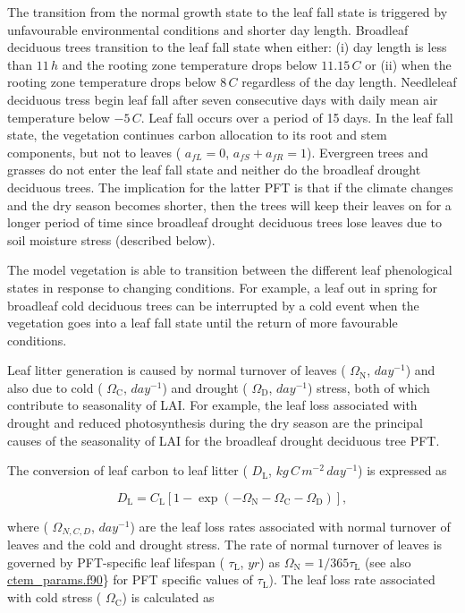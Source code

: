 The transition from the normal growth state to the leaf fall state is triggered by unfavourable environmental conditions and shorter day length. Broadleaf deciduous trees transition to the leaf fall state when either\+: (i) day length is less than $11\,h$ and the rooting zone temperature drops below $11.15\,C$ or (ii) when the rooting zone temperature drops below $8\,C$ regardless of the day length. Needleleaf deciduous tress begin leaf fall after seven consecutive days with daily mean air temperature below $-5\,C$. Leaf fall occurs over a period of 15 days. In the leaf fall state, the vegetation continues carbon allocation to its root and stem components, but not to leaves ( $a_{fL} = 0$, $a_{fS} + a_{fR} = 1$). Evergreen trees and grasses do not enter the leaf fall state and neither do the broadleaf drought deciduous trees. The implication for the latter P\+F\+T is that if the climate changes and the dry season becomes shorter, then the trees will keep their leaves on for a longer period of time since broadleaf drought deciduous trees lose leaves due to soil moisture stress (described below).

The model vegetation is able to transition between the different leaf phenological states in response to changing conditions. For example, a leaf out in spring for broadleaf cold deciduous trees can be interrupted by a cold event when the vegetation goes into a leaf fall state until the return of more favourable conditions.

Leaf litter generation is caused by normal turnover of leaves ( $\Omega_\mathrm{N}$, $day^{-1}$) and also due to cold ( $\Omega_\mathrm{C}$, $day^{-1}$) and drought ( $\Omega_\mathrm{D}$, $day^{-1}$) stress, both of which contribute to seasonality of L\+A\+I. For example, the leaf loss associated with drought and reduced photosynthesis during the dry season are the principal causes of the seasonality of L\+A\+I for the broadleaf drought deciduous tree P\+F\+T.

The conversion of leaf carbon to leaf litter ( $D_\mathrm{L}$, $kg\,C\,m^{-2}\,day^{-1}$) is expressed as

\[ \label{cltod} D_\mathrm{L} = C_\mathrm{L}[1 - \exp(-\Omega_\mathrm{N} - \Omega_\mathrm{C} - \Omega_{\mathrm{D}})],\]

where ( $\Omega_{N,C,D}$, $day^{-1}$) are the leaf loss rates associated with normal turnover of leaves and the cold and drought stress. The rate of normal turnover of leaves is governed by P\+F\+T-\/specific leaf lifespan ( $\tau_\mathrm{L}$, $yr$) as $\Omega_\mathrm{N}= 1/365 \tau_\mathrm{L}$ (see also \hyperlink{ctem__params_8f90}{ctem\+\_\+params.\+f90}\} for P\+F\+T specific values of $\tau_\mathrm{L}$). The leaf loss rate associated with cold stress ( $\Omega_\mathrm{C}$) is calculated as


